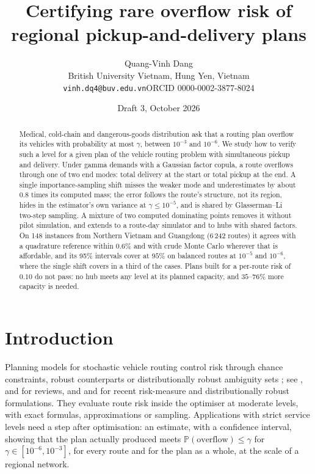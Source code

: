 \documentclass[11pt]{article}
\title{Certifying rare overflow risk of regional pickup-and-delivery plans}
\author{Quang-Vinh Dang\\
British University Vietnam, Hung Yen, Vietnam\\
\texttt{vinh.dq4@buv.edu.vn}\quad ORCID 0000-0002-3877-8024}
\date{Draft 3, October 2026}
\theoremstyle{definition}
\theoremstyle{remark}
\renewcommand{\P}{\mathbb{P}}
\begin{document}
\maketitle

\begin{abstract}
Medical, cold-chain and dangerous-goods distribution ask that a routing plan
overflow its vehicles with probability at most $\gamma$, between $10^{-3}$ and
$10^{-6}$. We study how to verify such a level for a given plan of the vehicle
routing problem with simultaneous pickup and delivery. Under gamma demands with
a Gaussian factor copula, a route overflows through one of two end modes: total
delivery at the start or total pickup at the end. A single importance-sampling
shift misses the weaker mode and underestimates by about $0.8$ times its
computed mass; the error follows the route's structure, not its region, hides
in the estimator's own variance at $\gamma\le10^{-5}$, and is shared by
Glasserman--Li two-step sampling. A mixture of two computed dominating points
removes it without pilot simulation, and extends to a route-day simulator and to
hubs with shared factors. On 148 instances from Northern Vietnam and Guangdong
(6\,242 routes) it agrees with a quadrature reference within $0.6\%$ and with
crude Monte Carlo wherever that is affordable, and its 95\% intervals cover at
$95\%$ on balanced routes at $10^{-5}$ and $10^{-6}$, where the single shift
covers in a third of the cases. Plans built for a per-route risk of $0.10$ do
not pass: no hub meets any level at its planned capacity, and $35$--$76\%$
more capacity is needed.
\end{abstract}

\section{Introduction}

Planning models for stochastic vehicle routing control risk through chance
constraints, robust counterparts or distributionally robust ambiguity sets
\citep{GounarisWiesemannFloudas2013,DinhFukasawaLuedtke2018,GhosalWiesemann2020};
see \citet{GendreauJabaliRei2016}, \citet{akhmetbek2024stochastic} and \citet{karimi2026stochastic} for reviews,
and \citet{Ghosal2024Unifying} and \citet{wang2023distributionally,yin2022distributionally} for recent
risk-measure and distributionally robust formulations. They evaluate route risk inside
the optimiser at moderate levels, with exact formulas, approximations or
sampling. Applications with strict service levels need a step after
optimisation: an estimate, with a confidence interval, showing that the plan
actually produced meets $\P(\text{overflow}) \le \gamma$ for
$\gamma \in [10^{-6}, 10^{-3}]$, for every route and for the plan as a whole,
at the scale of a regional network.
\end{document}
